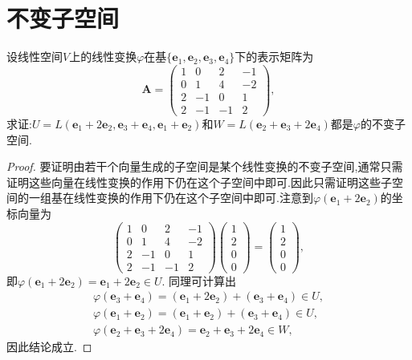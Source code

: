 \documentclass[../../main.tex]{subfiles}%
\begin{document}
\section{不变子空间}

\begin{example}
设线性空间\(V\)上的线性变换\(\varphi\)在基\(\{\boldsymbol{e}_1,\boldsymbol{e}_2,\boldsymbol{e}_3,\boldsymbol{e}_4\}\)下的表示矩阵为
\[
\boldsymbol{A}=\begin{pmatrix}
1&0&2&-1\\
0&1&4&-2\\
2&-1&0&1\\
2&-1&-1&2
\end{pmatrix},
\]
求证:\(U = L(\boldsymbol{e}_1 + 2\boldsymbol{e}_2,\boldsymbol{e}_3 + \boldsymbol{e}_4,\boldsymbol{e}_1 + \boldsymbol{e}_2)\)和\(W = L(\boldsymbol{e}_2 + \boldsymbol{e}_3 + 2\boldsymbol{e}_4)\)都是\(\varphi\)的不变子空间.
\end{example}
\begin{proof}
要证明由若干个向量生成的子空间是某个线性变换的不变子空间,通常只需证明这些向量在线性变换的作用下仍在这个子空间中即可.因此只需证明这些子空间的一组基在线性变换的作用下仍在这个子空间中即可.注意到\(\varphi(\boldsymbol{e}_1 + 2\boldsymbol{e}_2)\)的坐标向量为
\[
\begin{pmatrix}
1&0&2&-1\\
0&1&4&-2\\
2&-1&0&1\\
2&-1&-1&2
\end{pmatrix}
\begin{pmatrix}
1\\
2\\
0\\
0
\end{pmatrix}=
\begin{pmatrix}
1\\
2\\
0\\
0
\end{pmatrix},
\]
即\(\varphi(\boldsymbol{e}_1 + 2\boldsymbol{e}_2)=\boldsymbol{e}_1 + 2\boldsymbol{e}_2\in U\). 同理可计算出
\begin{gather*}
\varphi(\boldsymbol{e}_3 + \boldsymbol{e}_4)=(\boldsymbol{e}_1 + 2\boldsymbol{e}_2)+(\boldsymbol{e}_3 + \boldsymbol{e}_4)\in U,\\
\varphi(\boldsymbol{e}_1 + \boldsymbol{e}_2)=(\boldsymbol{e}_1 + \boldsymbol{e}_2)+(\boldsymbol{e}_3 + \boldsymbol{e}_4)\in U,\\
\varphi(\boldsymbol{e}_2 + \boldsymbol{e}_3 + 2\boldsymbol{e}_4)=\boldsymbol{e}_2 + \boldsymbol{e}_3 + 2\boldsymbol{e}_4\in W,
\end{gather*}
因此结论成立. 
\end{proof}
\end{document}
